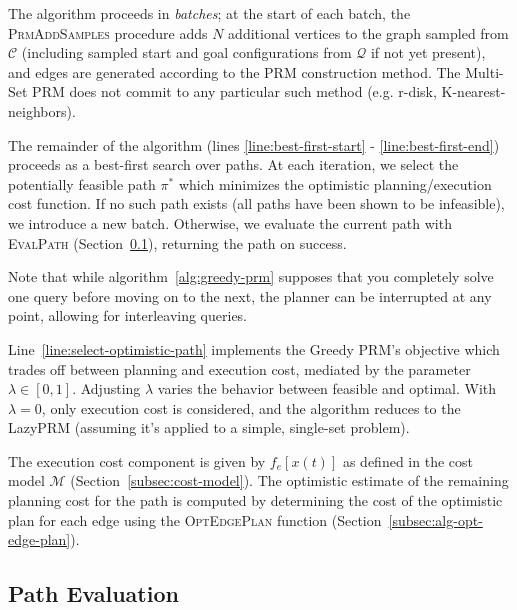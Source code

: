 \documentclass{report}
\begin{document}
The algorithm proceeds in \emph{batches};
at the start of each batch,
the \textsc{PrmAddSamples} procedure adds
$N$ additional vertices to the graph sampled from $\mathcal{C}$
(including sampled start and goal configurations from $\mathcal{Q}$
if not yet present),
and edges are generated according to the PRM construction method.
The Multi-Set PRM does not commit to any particular such method
(e.g. r-disk, K-nearest-neighbors).

The remainder of the algorithm
(lines \ref{line:best-first-start} - \ref{line:best-first-end})
proceeds as a best-first search over paths.
At each iteration,
we select the potentially feasible path $\pi^*$
which minimizes the optimistic
planning/execution cost function.
If no such path exists
(all paths have been shown to be infeasible),
we introduce a new batch.
Otherwise, we evaluate the current path with
\textsc{EvalPath}
(Section~\ref{subsec:alg-path-evaluation}),
returning the path on success.

Note that while
algorithm~\ref{alg:greedy-prm} supposes that you completely solve
one query before moving on to the next,
the planner can be interrupted at any point,
allowing for interleaving queries.

Line~\ref{line:select-optimistic-path}
implements the Greedy PRM's objective
which trades off between planning and execution cost,
mediated by the parameter $\lambda \in [0,1]$.
Adjusting $\lambda$ varies the behavior between feasible and optimal.
With $\lambda = 0$,
only execution cost is considered,
and the algorithm reduces to the LazyPRM
(assuming it's applied to a simple, single-set problem).

The execution cost component is given by $f_e[x(t)]$
as defined in the cost model $\mathcal{M}$
(Section~\ref{subsec:cost-model}).
The optimistic estimate of the remaining planning cost for the path
is computed by determining the cost of the optimistic plan for each
edge using the \textsc{OptEdgePlan} function
(Section~\ref{subsec:alg-opt-edge-plan}).

\subsection{Path Evaluation}
\label{subsec:alg-path-evaluation}
\end{document}

